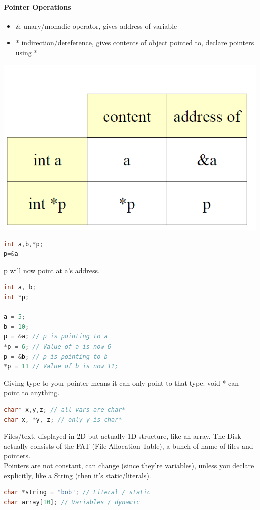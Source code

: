 \documentclass[12 pt]{article}
\begin{document}
\paragraph{Pointer Operations}
\begin{itemize}
	\item \& unary/monadic operator, gives address of variable
	\item * indirection/dereference, gives contents of object pointed to, declare pointers using *
	\end{itemize}
	\includegraphics[scale=0.5]{pont}
\begin{lstlisting}[language=c]
int a,b,*p;
p=&a
\end{lstlisting}
p will now point at a's address.
\begin{lstlisting}[language=c]
int a, b;
int *p;

a = 5;
b = 10;
p = &a; // p is pointing to a
*p = 6; // Value of a is now 6
p = &b; // p is pointing to b
*p = 11 // Value of b is now 11;
\end{lstlisting}
Giving type to your pointer means it can only point to that type. void * can point to anything.
\begin{lstlisting}[language=c]
char* x,y,z; // all vars are char*
char x, *y, z; // only y is char*
\end{lstlisting}
Files/text, displayed in 2D but actually 1D structure, like an array. The Disk actually consists of the FAT (File Allocation Table), a bunch of name of files and pointers.
\\ Pointers are not constant, can change (since they're variables), unless you declare explicitly, like a String (then it's static/literals).
\begin{lstlisting}[language=c]
char *string = "bob"; // Literal / static
char array[10]; // Variables / dynamic
\end{lstlisting}
\end{document}
